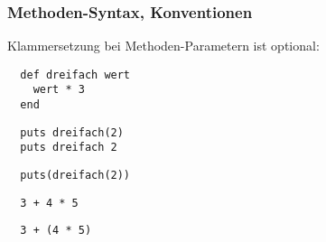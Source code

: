 \documentclass{beamer}
\begin{document}
\begin{frame}[fragile]
  \frametitle{Methoden-Syntax, Konventionen}
  Klammersetzung bei Methoden-Parametern ist optional:
  \begin{lstlisting}
  def dreifach wert 
    wert * 3
  end
  \end{lstlisting}
  \pause
  \begin{lstlisting}
  puts dreifach(2) 
  puts dreifach 2 
  \end{lstlisting}
  \pause
  \begin{lstlisting}
  puts(dreifach(2)) 
  \end{lstlisting}
  
  \pause
  \begin{lstlisting}
  3 + 4 * 5 
  \end{lstlisting}
  \pause
  \begin{lstlisting}
  3 + (4 * 5)
  \end{lstlisting}
\end{frame}
\end{document}
